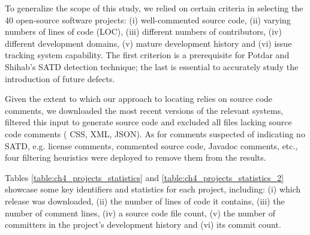 To generalize the scope of this study, we relied on certain criteria in selecting the 40 open-source software projects: (i) well-commented source code, (ii) varying numbers of lines of code (LOC), (iii) different numbers of contributors, (iv) different development domains, (v) mature development history and (vi) issue tracking system capability. The first criterion is a prerequisite for Potdar and Shihab's SATD detection technique; the last is essential to accurately study the introduction of future defects.

Given the extent to which our approach to locating \SATD relies on source code comments, we downloaded the most recent versions of the relevant systems, filtered this input to generate source code and excluded all files lacking source code comments (\eg{} CSS, XML, JSON). As for comments suspected of indicating no SATD, e.g. license comments, commented source code, Javadoc comments, etc., four filtering heuristics were deployed to remove them from the results.

Tables \ref{table:ch4_projects_statistics} and \ref{table:ch4_projects_statistics_2} showcase some key identifiers and statistics for each project, including: (i) which release was downloaded, (ii) the number of lines of code it contains, (iii) the number of comment lines, (iv) a source code file count, (v) the number of committers in the project's development history and (vi) its commit count.


